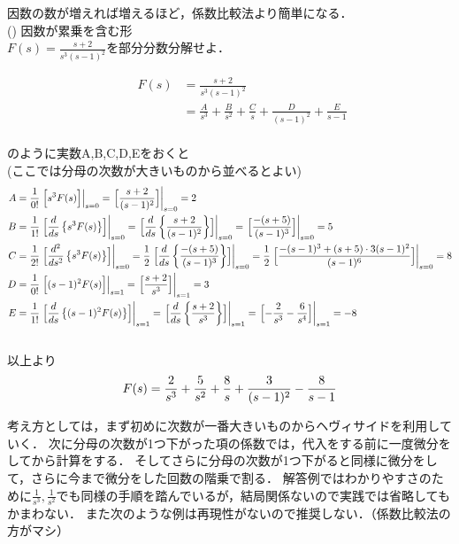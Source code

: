 \documentclass[a4paper,12pt]{report}
\begin{document}
  因数の数が増えれば増えるほど，係数比較法より簡単になる．\\

\quad({}) 因数が累乗を含む形 \\

\qquad \(F(s) =  \frac{s+2}{s^3(s-1)^2}\)を部分分数分解せよ．

\begin{align*}
  \qquad F(s) &= \frac{s+2}{s^3(s-1)^2} \\
      &= \frac{A}{s^3}+ \frac{B}{s^2}+ \frac{C}{s}
      + \frac{D}{(s-1)^2}+ \frac{E}{s-1}
\end{align*}\\
のように実数A,B,C,D,Eをおくと\\
(ここでは分母の次数が大きいものから並べるとよい)\\
\begin{align*}
  A &= \frac{1}{0!}\left.\Bigl[s^3F(s)\Bigr]\right|_{s=0} = \left.\Bigl[\frac{s+2}{(s-1)^2}\Bigr]\right|_{s=0} = 2\\
  B &= \frac{1}{1!}\left.\Bigl[\frac{d}{ds} \left\{s^3F(s)\right\}\Bigr]\right|_{s=0}
    = \left.\Bigl[\frac{d}{ds} \left\{\frac{s+2}{(s-1)^2}\right\}\Bigr]\right|_{s=0}
    = \left.\Bigl[\frac{-(s+5)}{(s-1)^3}\Bigr]\right|_{s=0} 
    = 5 \\
  C &=  \frac{1}{2!} \left.\Bigl[\frac{d^2}{ds^2} \left\{s^3F(s)\right\}\Bigr]\right|_{s=0} 
    = \frac{1}{2} \left.\Bigl[\frac{d}{ds} \left\{\frac{-(s+5)}{(s-1)^3}\right\}\Bigr]\right|_{s=0}  
    = \frac{1}{2} \left.\Bigl[\frac{-(s-1)^3+(s+5)\cdot3(s-1)^2}{(s-1)^6}\Bigr]\right|_{s=0} 
    = 8\\
  D &= \frac{1}{0!} \left.\Bigl[(s-1)^2F(s)\Bigr]\right|_{s=1}
    = \left.\Bigl[\frac{s+2}{s^3}\Bigr]\right|_{s=1}
    = 3\\
  E &= \frac{1}{1!} \left.\Bigl[\frac{d}{ds}\left\{(s-1)^2F(s)\right\}\Bigr]\right|_{s=1}
    = \left.\Bigl[\frac{d}{ds}\left\{\frac{s+2}{s^3}\right\}\Bigr]\right|_{s=1}
    = \left.\Bigl[-\frac{2}{s^3}-\frac{6}{s^4}\Bigr]\right|_{s=1} 
    = -8\\
\end{align*}\\
以上より
\[
  F(s) = \frac{2}{s^3} + \frac{5}{s^2}+ \frac{8}{s} + \frac{3}{(s-1)^2} - \frac{8}{s-1}\\
\]
\newpage

考え方としては，まず初めに次数が一番大きいものからヘヴィサイドを利用していく．
次に分母の次数が1つ下がった項の係数では，代入をする前に一度微分をしてから計算をする．
そしてさらに分母の次数が1つ下がると同様に微分をして，さらに今まで微分をした回数の階乗で割る．
解答例ではわかりやすさのために\(\frac{1}{s^3},\frac{1}{s^2}\)でも同様の手順を踏んでいるが，結局関係ないので実践では省略してもかまわない．
また次のような例は再現性がないので推奨しない．（係数比較法の方がマシ）\\
\end{document}
